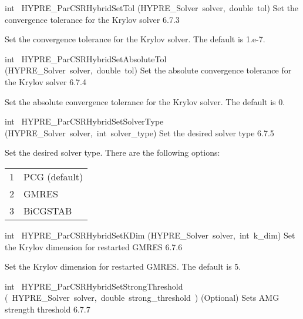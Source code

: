 \documentclass{article}
\begin{document}
\begin{cxxentry}
\begin{cxxentry}
\begin{cxxfunction}
\begin{cxxdoc}
\end{cxxdoc}
\end{cxxfunction}
\begin{cxxfunction}
{int\ }
        {HYPRE\_ParCSRHybridSetTol}
        {(HYPRE\_Solver\ solver,\ double\ tol)}
        {
Set the convergence tolerance for the Krylov solver}
        {6.7.3}
\begin{cxxdoc}

Set the convergence tolerance for the Krylov solver. The default is 1.e-7.
\end{cxxdoc}
\end{cxxfunction}
\begin{cxxfunction}
{int\ }
        {HYPRE\_ParCSRHybridSetAbsoluteTol}
        {(HYPRE\_Solver\ solver,\ double\ tol)}
        {
Set the absolute convergence tolerance for the Krylov solver}
        {6.7.4}
\begin{cxxdoc}

Set the absolute convergence tolerance for the Krylov solver. The default is 0.
\end{cxxdoc}
\end{cxxfunction}
\begin{cxxfunction}
{int\ }
        {HYPRE\_ParCSRHybridSetSolverType}
        {(HYPRE\_Solver\ solver,\ int\ solver\_type)}
        {
Set the desired solver type}
        {6.7.5}
\begin{cxxdoc}

Set the desired solver type. There are the following options:
\begin{tabular}{l l}
1 & PCG (default) \\
2 & GMRES \\
3 & BiCGSTAB
\end{tabular}
\end{cxxdoc}
\end{cxxfunction}
\begin{cxxfunction}
{int\ }
        {HYPRE\_ParCSRHybridSetKDim}
        {(HYPRE\_Solver\ solver,\ int\ k\_dim)}
        {
Set the Krylov dimension for restarted GMRES}
        {6.7.6}
\begin{cxxdoc}

Set the Krylov dimension for restarted GMRES.
The default is 5.
\end{cxxdoc}
\end{cxxfunction}
\begin{cxxfunction}
{int\ }
        {HYPRE\_ParCSRHybridSetStrongThreshold}
        {(\ HYPRE\_Solver\ solver,\ double\ strong\_threshold\ )}
        {
(Optional) Sets AMG strength threshold}
        {6.7.7}
\begin{cxxdoc}


\end{cxxdoc}
\end{cxxfunction}
\end{cxxentry}
\end{cxxentry}
\end{document}
